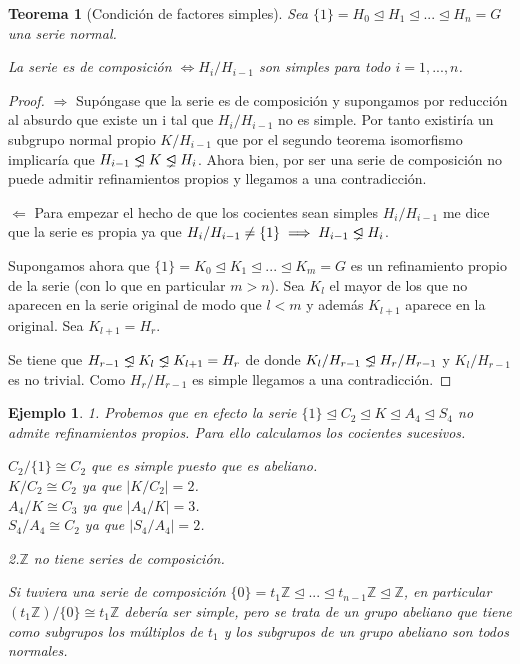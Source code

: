\documentclass{article}
\theoremstyle{theorem-style}  %
\newtheorem{theorem}{Teorema}[section]  %
\theoremstyle{definition-style}
\theoremstyle{example-style}
\newtheorem{example}{Ejemplo}[section]
\newcommand{\propernormal}{%
  \mathrel{\ooalign{$\lneq$\cr\raise.22ex\hbox{$\lhd$}\cr}}}
\begin{document}
\begin{theorem}[Condición de factores simples]
Sea $\{1\} = H_0 \trianglelefteq H_1 \trianglelefteq ... \trianglelefteq H_n = G$ una serie normal. 

La serie es de composición $\iff H_i/H_{i-1}$ son simples para todo $i = 1,...,n$.
\end{theorem}
\begin{proof}
$\Rightarrow$ Supóngase que la serie es de composición y supongamos por reducción al absurdo que existe un i tal que $H_i/H_{i-1}$ no es simple. Por tanto existiría un subgrupo normal propio $K/H_{i-1}$ que por el segundo teorema isomorfismo implicaría que $H_{i-1} \propernormal K \propernormal H_{i}$. Ahora bien, por ser una serie de composición no puede admitir refinamientos propios y llegamos a una contradicción.

$\Leftarrow$ Para empezar el hecho de que los cocientes sean simples $H_i/H_{i-1}$ me dice que la serie es propia ya que $H_i/H_{i-1} \neq \{1\} \implies H_{i-1} \propernormal H_i$.

Supongamos ahora que $\{1\} = K_0 \trianglelefteq K_1 \trianglelefteq ... \trianglelefteq K_m = G$ es un refinamiento propio de la serie (con lo que en particular $m > n$). Sea $K_l$ el mayor de los que no aparecen en la serie original de modo que $l < m$ y además $K_{l+1}$ aparece en la original. Sea $K_{l+1} = H_r$. 

Se tiene que $H_{r-1} \propernormal K_l \propernormal K_{l+1} = H_r$ de donde $K_l/H_{r-1} \propernormal H_r/H_{r-1}$ y $K_l/H_{r-1}$ es no trivial. Como $H_r/H_{r-1}$ es simple llegamos a una contradicción.
\end{proof}

\begin{example}
1. Probemos que en efecto la serie $\{1\} \trianglelefteq C_2 \trianglelefteq K \trianglelefteq A_4 \trianglelefteq S_4$ no admite refinamientos propios. Para ello calculamos los cocientes sucesivos. 

$C_2/\{1\} \cong C_2$ que es simple puesto que es abeliano.\\
$K/C_2 \cong C_2$ ya que $|K/C_2| = 2$.\\
$A_4/K \cong C_3$ ya que $|A_4/K| = 3$.\\
$S_4/A_4 \cong C_2$ ya que $|S_4/A_4| = 2$.
 
2.$\mathbb{Z}$ no tiene series de composición.

Si tuviera una serie de composición $\{0\} = t_1\mathbb{Z} \trianglelefteq ... \trianglelefteq t_{n-1}\mathbb{Z} \trianglelefteq \mathbb{Z}$, en particular $(t_1\mathbb{Z})/\{0\} \cong t_1\mathbb{Z}$ debería ser simple, pero se trata de un grupo abeliano que tiene como subgrupos los múltiplos de $t_1$ y los subgrupos de un grupo abeliano son todos normales.
\end{example}
\end{document}
